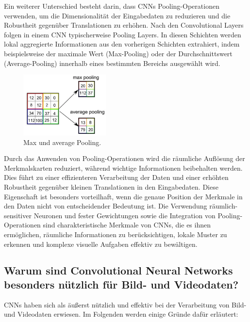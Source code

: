         Ein weiterer Unterschied besteht darin, dass \acp{CNN} Pooling-Operationen verwenden, um die Dimensionalität der Eingabedaten zu reduzieren und die Robustheit gegenüber Translationen zu erhöhen. 
        Nach den Convolutional Layers folgen in einem CNN typischerweise Pooling Layers. 
        In diesen Schichten werden lokal aggregierte Informationen aus den vorherigen Schichten extrahiert, indem beispielsweise der maximale Wert (Max-Pooling) oder der Durchschnittswert (Average-Pooling) innerhalb eines bestimmten Bereichs ausgewählt wird. 

        \begin{figure}[h]
            \centering
            \includegraphics[width=0.4\textwidth]{img/cnn_pooling.png}
            \caption{Max und average Pooling.}
            \label{fig:cnn_kernel_sobel}
        \end{figure}
        
        Durch das Anwenden von Pooling-Operationen wird die räumliche Auflösung der Merkmalskarten reduziert, während wichtige Informationen beibehalten werden. 
        Dies führt zu einer effizienteren Verarbeitung der Daten und einer erhöhten Robustheit gegenüber kleinen Translationen in den Eingabedaten. 
        Diese Eigenschaft ist besonders vorteilhaft, wenn die genaue Position der Merkmale in den Daten nicht von entscheidender Bedeutung ist.
        Die Verwendung räumlich-sensitiver Neuronen und fester Gewichtungen sowie die Integration von Pooling-Operationen sind charakteristische Merkmale von \acfp{CNN}, die es ihnen ermöglichen, räumliche Informationen zu berücksichtigen, lokale Muster zu erkennen und komplexe visuelle Aufgaben effektiv zu bewältigen.

\subsection{Warum sind Convolutional Neural Networks besonders nützlich für Bild- und Videodaten?}

    \acfp{CNN} haben sich als äußerst nützlich und effektiv bei der Verarbeitung von Bild- und Videodaten erwiesen. Im Folgenden werden einige Gründe dafür erläutert:

